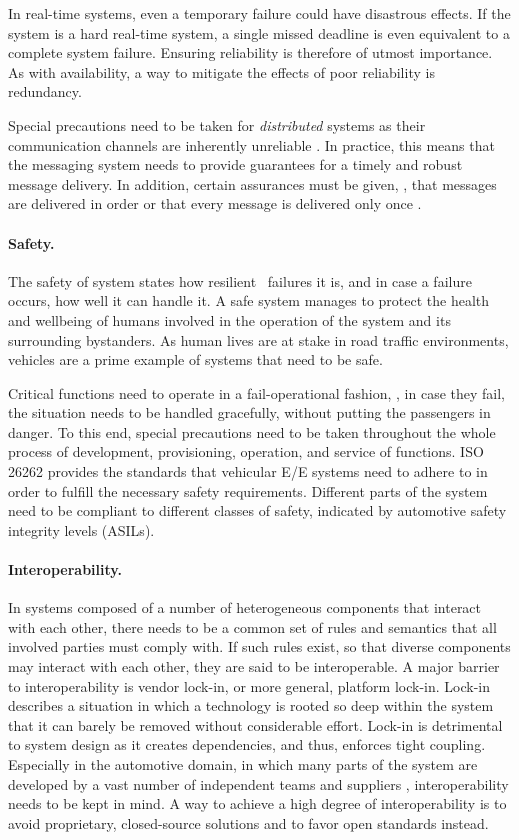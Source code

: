In real-time systems, even a temporary failure could have disastrous effects. If the system is a hard real-time system, a single missed deadline is even equivalent to a complete system failure. Ensuring reliability is therefore of utmost importance. As with availability, a way to mitigate the effects of poor reliability is redundancy.

Special precautions need to be taken for \emph{distributed} systems as their communication channels are inherently unreliable \cite{tanenbaum2017distributed}. In practice, this means that the messaging system needs to provide guarantees for a timely and robust message delivery. In addition, certain assurances must be given, \eg , that messages are delivered in order or that every message is delivered only once \cite{o2007quality}. 

\paragraph{Safety.}
The safety of system states how resilient \wrt\ failures it is, and in case a failure occurs, how well it can handle it. A safe system manages to protect the health and wellbeing of humans involved in the operation of the system and its surrounding bystanders.
As human lives are at stake in road traffic environments, vehicles are a prime example of systems that need to be safe.

Critical functions need to operate in a fail-operational fashion, \ie , in case they fail, the situation needs to be handled gracefully, without putting the passengers in danger. To this end, special precautions need to be taken throughout the whole process of development, provisioning, operation, and service of functions. ISO 26262 \cite{iso201126262} provides the standards that vehicular E/E systems need to adhere to in order to fulfill the necessary safety requirements. Different parts of the system need to be compliant to different classes of safety, indicated by automotive safety integrity levels (ASILs).

\paragraph{Interoperability.} 
In systems composed of a number of heterogeneous components that interact with each other, there needs to be a common set of rules and semantics that all involved parties must comply with. If such rules exist, so that diverse components may interact with each other, they are said to be interoperable.
A major barrier to interoperability is vendor lock-in, or more general, platform lock-in. Lock-in describes a situation in which a technology is rooted so deep within the system that it can barely be removed without considerable effort. Lock-in is detrimental to system design as it creates dependencies, and thus, enforces tight coupling. Especially in the automotive domain, in which many parts of the system are developed by a vast number of independent teams and suppliers \cite{broy2006challenges}, interoperability needs to be kept in mind. A way to achieve a high degree of interoperability is to avoid proprietary, closed-source solutions and to favor open standards instead.


